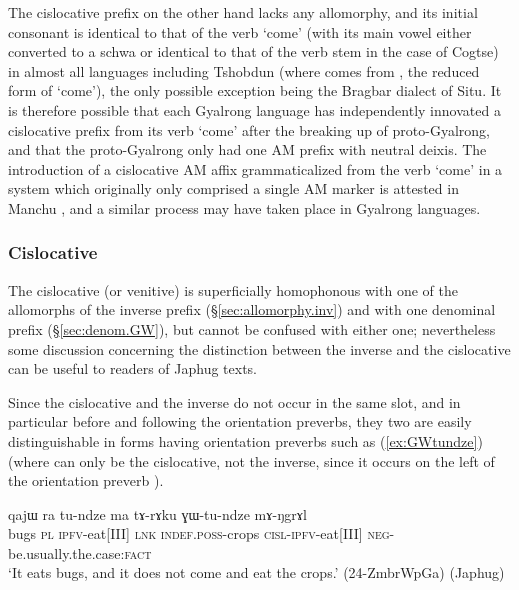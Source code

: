 The cislocative prefix on the other hand lacks any allomorphy, and its initial consonant is identical to that of the verb `come' (with its main vowel either converted to a schwa or identical to that of the verb stem in the case of Cogtse) in almost all languages including Tshobdun (where  comes from , the reduced form of  `come'), the only possible exception being the Bragbar dialect of Situ. It is therefore possible that each Gyalrong language has independently innovated a cislocative prefix from its verb `come' after the breaking up of proto-Gyalrong, and that the proto-Gyalrong only had one AM prefix with neutral deixis. The introduction of a cislocative AM affix grammaticalized from the verb `come' in a system which originally only comprised a single AM marker is attested in Manchu \citep{fuente18am}, and a similar process may have taken place in Gyalrong languages.

\subsubsection{Cislocative} \label{sec:cislocative.morpho}
The cislocative (or venitive)  is superficially homophonous with one of the allomorphs of the inverse prefix  (§\ref{sec:allomorphy.inv}) and with one denominal prefix (§\ref{sec:denom.GW}), but cannot be confused with either one; nevertheless some discussion concerning the distinction between the inverse and the cislocative can be useful to readers of Japhug texts.

Since the cislocative and the inverse do not occur in the same slot, and in particular before and following the orientation preverbs, they two are easily distinguishable in forms having orientation preverbs such as (\ref{ex:GWtundze}) (where  can only be the cislocative, not the inverse, since it occurs on the left of the orientation preverb ).

\begin{exe}
\ex \label{ex:GWtundze}
 \gll qajɯ ra tu-ndze ma tɤ-rɤku ɣɯ-tu-ndze mɤ-ŋgrɤl \\
bugs \textsc{pl} \textsc{ipfv}-eat[III] \textsc{lnk} \textsc{indef}.\textsc{poss}-crops   \textsc{cisl}-\textsc{ipfv}-eat[III] \textsc{neg}-be.usually.the.case:\textsc{fact} \\
\glt `It eats bugs, and it does not come and eat the crops.' (24-ZmbrWpGa) (Japhug)
\end{exe}

